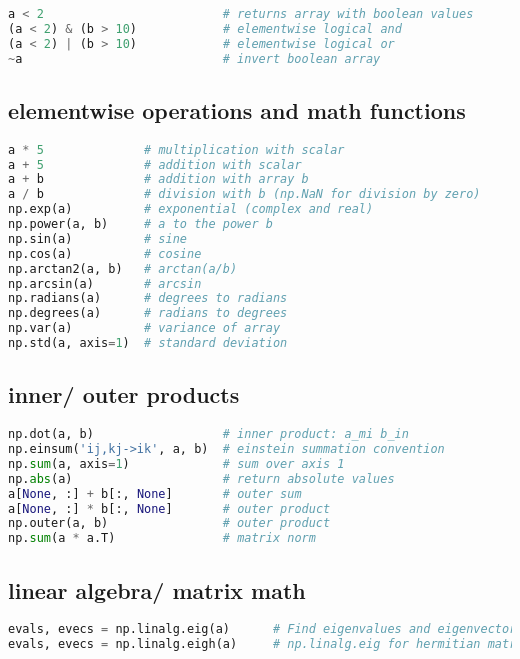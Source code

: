 \begin{lstlisting}[language=Python]
a < 2                         # returns array with boolean values
(a < 2) & (b > 10)            # elementwise logical and
(a < 2) | (b > 10)            # elementwise logical or
~a                            # invert boolean array
\end{lstlisting}

\subsection{elementwise operations and math
functions}\label{elementwise-operations-and-math-functions}

\begin{lstlisting}[language=Python]
a * 5              # multiplication with scalar
a + 5              # addition with scalar
a + b              # addition with array b
a / b              # division with b (np.NaN for division by zero)
np.exp(a)          # exponential (complex and real)
np.power(a, b)     # a to the power b
np.sin(a)          # sine
np.cos(a)          # cosine
np.arctan2(a, b)   # arctan(a/b)
np.arcsin(a)       # arcsin
np.radians(a)      # degrees to radians
np.degrees(a)      # radians to degrees
np.var(a)          # variance of array
np.std(a, axis=1)  # standard deviation
\end{lstlisting}

\subsection{inner/ outer products}\label{inner-outer-products}

\begin{lstlisting}[language=Python]
np.dot(a, b)                  # inner product: a_mi b_in
np.einsum('ij,kj->ik', a, b)  # einstein summation convention
np.sum(a, axis=1)             # sum over axis 1
np.abs(a)                     # return absolute values
a[None, :] + b[:, None]       # outer sum
a[None, :] * b[:, None]       # outer product
np.outer(a, b)                # outer product
np.sum(a * a.T)               # matrix norm
\end{lstlisting}

\subsection{linear algebra/ matrix
math}\label{linear-algebra-matrix-math}

\begin{lstlisting}[language=Python]
evals, evecs = np.linalg.eig(a)      # Find eigenvalues and eigenvectors
evals, evecs = np.linalg.eigh(a)     # np.linalg.eig for hermitian matrix
\end{lstlisting}

